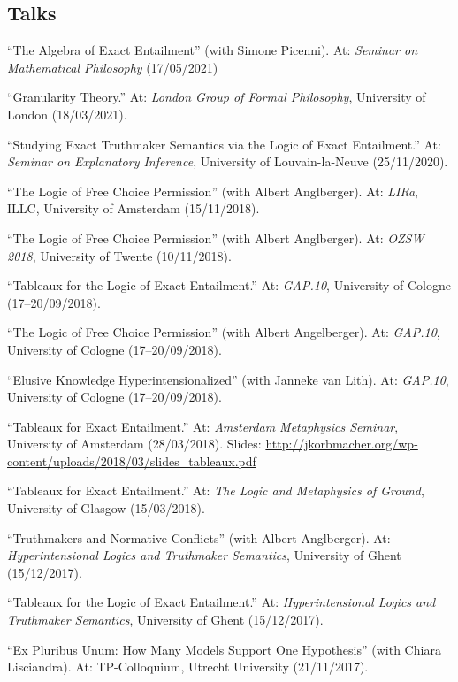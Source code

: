 \subsection*{Talks}
\begin{etaremune}
  \item ``The Algebra of Exact Entailment'' (with Simone Picenni). At: \emph{Seminar on Mathematical Philosophy} (17/05/2021)
  \item ``Granularity Theory.'' At: \emph{London Group of Formal Philosophy}, University of London (18/03/2021).
  \item ``Studying Exact Truthmaker Semantics via the Logic of Exact Entailment.'' At: \emph{Seminar on Explanatory Inference}, University of Louvain-la-Neuve (25/11/2020).
  \item ``The Logic of Free Choice Permission'' (with Albert Anglberger). At: \emph{LIRa}, ILLC, University of Amsterdam (15/11/2018).
  \item ``The Logic of Free Choice Permission'' (with Albert Anglberger). At: \emph{OZSW 2018}, University of Twente (10/11/2018).
  \item ``Tableaux for the Logic of Exact Entailment.'' At: \emph{GAP.10}, University of Cologne (17--20/09/2018).
  \item ``The Logic of Free Choice Permission'' (with Albert Angelberger). At: \emph{GAP.10}, University of Cologne (17--20/09/2018).
  \item ``Elusive Knowledge Hyperintensionalized'' (with Janneke van Lith). At: \emph{GAP.10}, University of Cologne (17--20/09/2018).
  \item ``Tableaux for Exact Entailment.'' At: \emph{Amsterdam Metaphysics Seminar}, University of Amsterdam (28/03/2018). Slides: \url{http://jkorbmacher.org/wp-content/uploads/2018/03/slides_tableaux.pdf}
  \item ``Tableaux for Exact Entailment.'' At: \emph{The Logic and Metaphysics of Ground}, University of Glasgow (15/03/2018).
  \item ``Truthmakers and Normative Conflicts'' (with Albert Anglberger). At: \emph{Hyperintensional Logics and Truthmaker Semantics}, University of Ghent (15/12/2017).
  \item ``Tableaux for the Logic of Exact Entailment.'' At: \emph{Hyperintensional Logics and Truthmaker Semantics}, University of Ghent (15/12/2017).
  \item ``Ex Pluribus Unum: How Many Models Support One Hypothesis'' (with Chiara Lisciandra). At: TP-Colloquium, Utrecht University (21/11/2017).

\end{etaremune}
